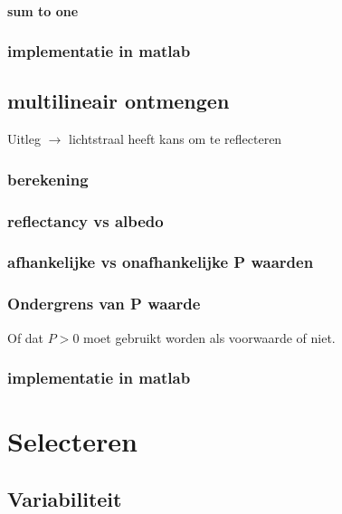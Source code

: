 \documentclass[12pt]{report}
\begin{document}
\subsubsection{sum to one}



\subsection{implementatie in matlab}

\section{multilineair ontmengen}

Uitleg $\rightarrow$ lichtstraal heeft kans om te reflecteren

\subsection{berekening}

\subsection{reflectancy vs albedo}

\subsection{afhankelijke vs onafhankelijke P waarden}

\subsection{Ondergrens van P waarde}

Of dat $P > 0$ moet gebruikt worden als voorwaarde of niet.

\subsection{implementatie in matlab}

\chapter{Selecteren} \label{sec:select}

\section{Variabiliteit}
\end{document}
